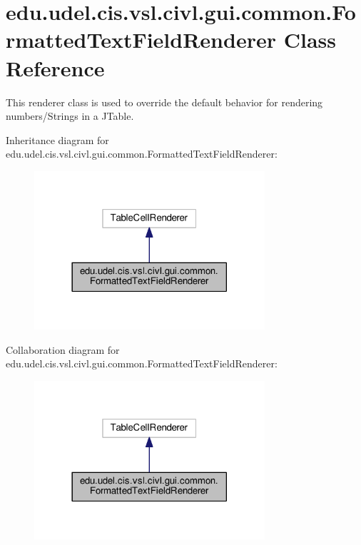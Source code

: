 \hypertarget{classedu_1_1udel_1_1cis_1_1vsl_1_1civl_1_1gui_1_1common_1_1FormattedTextFieldRenderer}{}\section{edu.\+udel.\+cis.\+vsl.\+civl.\+gui.\+common.\+Formatted\+Text\+Field\+Renderer Class Reference}
\label{classedu_1_1udel_1_1cis_1_1vsl_1_1civl_1_1gui_1_1common_1_1FormattedTextFieldRenderer}


This renderer class is used to override the default behavior for rendering numbers/\+Strings in a J\+Table.  




Inheritance diagram for edu.\+udel.\+cis.\+vsl.\+civl.\+gui.\+common.\+Formatted\+Text\+Field\+Renderer\+:
\nopagebreak
\begin{figure}[H]
\begin{center}
\leavevmode
\includegraphics[width=242pt]{classedu_1_1udel_1_1cis_1_1vsl_1_1civl_1_1gui_1_1common_1_1FormattedTextFieldRenderer__inherit__graph}
\end{center}
\end{figure}


Collaboration diagram for edu.\+udel.\+cis.\+vsl.\+civl.\+gui.\+common.\+Formatted\+Text\+Field\+Renderer\+:
\nopagebreak
\begin{figure}[H]
\begin{center}
\leavevmode
\includegraphics[width=242pt]{classedu_1_1udel_1_1cis_1_1vsl_1_1civl_1_1gui_1_1common_1_1FormattedTextFieldRenderer__coll__graph}
\end{center}
\end{figure}

